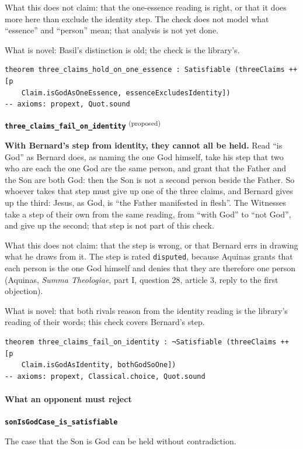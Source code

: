 \documentclass[11pt,paper=\testimonypaper,DIV=13,parskip=false]{scrartcl}
\begin{document}
What this does not claim: that the one-essence reading is right, or that it does more here than exclude the identity step. The check does not model what “essence” and “person” mean; that analysis is not yet done.

What is novel: Basil’s distinction is old; the check is the library’s.

{\small\begin{verbatim}
theorem three_claims_hold_on_one_essence : Satisfiable (threeClaims ++ [p
    Claim.isGodAsOneEssence, essenceExcludesIdentity])
-- axioms: propext, Quot.sound
\end{verbatim}}
\par\medskip\noindent\textbf{\texttt{three\_\allowbreak{}claims\_\allowbreak{}fail\_\allowbreak{}on\_\allowbreak{}identity}} \textsuperscript{(proposed)}\par\nobreak\noindent
\textbf{With Bernard’s step from identity, they cannot all be held.} Read “is God” as Bernard does, as naming the one God himself, take his step that two who are each the one God are the same person, and grant that the Father and the Son are both God: then the Son is not a second person beside the Father. So whoever takes that step must give up one of the three claims, and Bernard gives up the third: Jesus, as God, is “the Father manifested in flesh”. The Witnesses take a step of their own from the same reading, from “with God” to “not God”, and give up the second; that step is not part of this check.

What this does not claim: that the step is wrong, or that Bernard errs in drawing what he draws from it. The step is rated \texttt{disputed}, because Aquinas grants that each person is the one God himself and denies that they are therefore one person (Aquinas, \emph{Summa Theologiae}, part I, question 28, article 3, reply to the first objection).

What is novel: that both rivals reason from the identity reading is the library’s reading of their words; this check covers Bernard’s step.

{\small\begin{verbatim}
theorem three_claims_fail_on_identity : ¬Satisfiable (threeClaims ++ [p
    Claim.isGodAsIdentity, bothGodSoOne])
-- axioms: propext, Classical.choice, Quot.sound
\end{verbatim}}
\paragraph*{What an opponent must reject}
\leavevmode\par\nobreak
\par\medskip\noindent\textbf{\texttt{son\allowbreak{}Is\allowbreak{}God\allowbreak{}Case\_\allowbreak{}is\_\allowbreak{}satisfiable}}\par\nobreak\noindent
The case that the Son is God can be held without contradiction.
\end{document}
